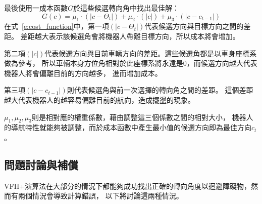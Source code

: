 最後使用一成本函數$G$於這些候選轉向角中找出最佳解：
\begin{equation}
	G(c) = \mu_1\cdot(|c - \Theta_t|) + \mu_2\cdot(|c|) + \mu_3\cdot(|c - c_{t-1}|)
	\label{e:cost_function}
\end{equation}
在式~\ref{e:cost_function}中，第一項$(|c - \Theta_t|)$代表候選方向與目標方向之間的差距。
差距越大表示該候選角會將機器人帶離目標方向，所以成本將會增加。

第二項$(|c|)$代表候選方向與目前車輛方向的差距。這些候選角都是以車身座標系做為參考，
所以車輛本身方位角相對於此座標系將永遠是$0$，而候選方向越大代表機器人將會偏離目前的方向越多，
進而增加成本。

第三項$(|c - c_{t-1}|)$則代表候選角與前一次選擇的轉向角之間的差距。
這個差距越大代表機器人的越容易偏離目前的航向，造成擺盪的現象。

$\mu_1,\mu_2,\mu_3$則是相對應的權重係數，藉由調整這三個係數之間的相對大小，
機器人的導航特性就能夠被調整，而於成本函數中產生最小值的候選方向即為最佳方向$c_t$。

\subsection{問題討論與補償}
\label{subsec:problem}
VFH+演算法在大部分的情況下都能夠成功找出正確的轉向角度以迴避障礙物，然而有兩個情況會導致計算錯誤，
以下將討論這兩種情況。

